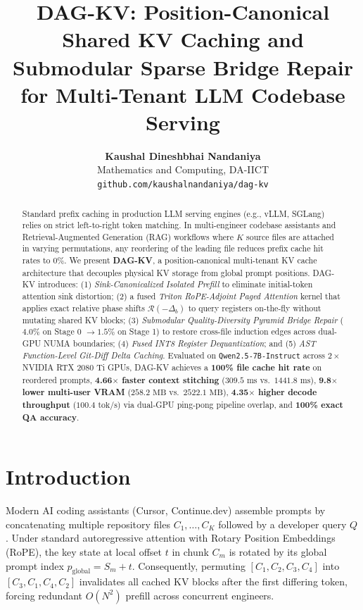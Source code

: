 \documentclass[10pt,twocolumn]{article}
\title{\textbf{DAG-KV: Position-Canonical Shared KV Caching and Submodular Sparse Bridge Repair for Multi-Tenant LLM Codebase Serving}}
\author{
  \textbf{Kaushal Dineshbhai Nandaniya} \\
  Mathematics and Computing, DA-IICT \\
  \texttt{github.com/kaushalnandaniya/dag-kv}
}
\date{}
\begin{document}
\maketitle

\begin{abstract}
Standard prefix caching in production LLM serving engines (e.g., vLLM, SGLang) relies on strict left-to-right token matching. In multi-engineer codebase assistants and Retrieval-Augmented Generation (RAG) workflows where $K$ source files are attached in varying permutations, any reordering of the leading file reduces prefix cache hit rates to $0\%$. We present \textbf{DAG-KV}, a position-canonical multi-tenant KV cache architecture that decouples physical KV storage from global prompt positions. DAG-KV introduces: (1) \emph{Sink-Canonicalized Isolated Prefill} to eliminate initial-token attention sink distortion; (2) a fused \emph{Triton RoPE-Adjoint Paged Attention} kernel that applies exact relative phase shifts $\mathcal{R}(-\Delta_b)$ to query registers on-the-fly without mutating shared KV blocks; (3) \emph{Submodular Quality-Diversity Pyramid Bridge Repair} ($4.0\%$ on Stage 0 $\to 1.5\%$ on Stage 1) to restore cross-file induction edges across dual-GPU NUMA boundaries; (4) \emph{Fused INT8 Register Dequantization}; and (5) \emph{AST Function-Level Git-Diff Delta Caching}. Evaluated on \texttt{Qwen2.5-7B-Instruct} across $2\times$ NVIDIA RTX 2080 Ti GPUs, DAG-KV achieves a \textbf{100\% file cache hit rate} on reordered prompts, \textbf{4.66$\times$ faster context stitching} ($309.5\text{ ms}$ vs.\ $1441.8\text{ ms}$), \textbf{9.8$\times$ lower multi-user VRAM} ($258.2\text{ MB}$ vs.\ $2522.1\text{ MB}$), \textbf{4.35$\times$ higher decode throughput} ($100.4\text{ tok/s}$) via dual-GPU ping-pong pipeline overlap, and \textbf{100\% exact QA accuracy}.
\end{abstract}

\section{Introduction}
Modern AI coding assistants (Cursor, Continue.dev) assemble prompts by concatenating multiple repository files $C_1, \dots, C_K$ followed by a developer query $Q$. Under standard autoregressive attention with Rotary Position Embeddings (RoPE), the key state at local offset $t$ in chunk $C_m$ is rotated by its global prompt index $p_{\text{global}} = S_m + t$. Consequently, permuting $[C_1, C_2, C_3, C_4]$ into $[C_3, C_1, C_4, C_2]$ invalidates all cached KV blocks after the first differing token, forcing redundant $O(N^2)$ prefill across concurrent engineers.
\end{document}
